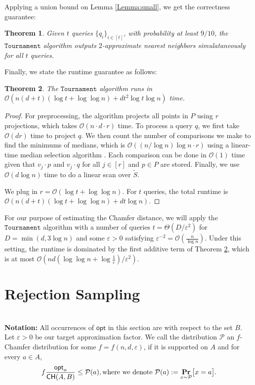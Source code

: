\documentclass[11pt]{article}
\newcommand{\eps}{\varepsilon}
\theoremstyle{plain}
\newtheorem{theorem}{Theorem}[section]
\newcommand{\calP}{\mathcal{P}} \newcommand{\calD}{\mathcal{D}}
\newcommand{\OO}{\mathcal{O}}
\newcommand{\ppr}[2]{\underset{#1}{\text{\bf Pr}} \normalfont\bigl[ #2 \bigr]}
\newcommand{\opt}{\mathsf{opt}}
\newcommand{\Tournament}{\texttt{Tournament}}
\begin{document}
Applying a union bound on Lemma \ref{Lemma:small}, we get the correctness guarantee:

\begin{theorem}
    Given $t$ queries $\{q_i\}_{i \in [t]}$, with probability at least $9/10$, the $\Tournament$ algorithm outputs $2$-approximate nearest neighbors simulataneously for all $t$ queries.
\end{theorem}

Finally, we state the runtime guarantee as follows:

\begin{theorem}\label{Theorem:tournamentTime}
    The $\Tournament$ algorithm runs in $\OO(n (d+ t) (\log t + \log \log n) + dt^2 \log t \log n) $ time.
\end{theorem}


\begin{proof}
    For preprocessing, the algorithm projects all points in $P$ using $r$ projections, which takes $\OO(n \cdot d \cdot r)$ time.
    To process a query $q$, we first take $\OO(dr)$ time to project $q$. We then count the number of comparisons we make to find the minimums of medians, which is $\OO((n/\log n)\log n \cdot r)$ using a linear-time median selection algorithm \cite{BFP73}. Each comparison can be done in $\OO(1)$ time given that $v_j \cdot p$ and $v_j \cdot q$ for all $j \in [r]$ and $p \in P$ are stored. Finally, we use $\OO(d \log n)$ time to do a linear scan over $\tilde{S}$.
    
    We plug in $r = \OO(\log t + \log \log n)$.
    For $t$ queries, the total runtime is $\OO(n (d+ t) (\log t + \log \log n) + dt \log n) $.
\end{proof}

For our purpose of estimating the Chamfer distance, we will apply the $\Tournament$ algorithm with a number of queries $t = \Theta({{D}}/\eps^2)$ for ${{D}} = \min{(d, 3\log n)}$ and some $\eps > 0$ satisfying $\eps^{-2} = \OO(\frac{n}{\log n})$. Under this setting, the runtime is dominated by the first additive term of Theorem \ref{Theorem:tournamentTime}, which is at most $\OO(n d(\log\log n+\log\frac{1}{\eps})/\eps^2)$.





 \section{Rejection Sampling}
\ \\
{\bf Notation:} All occurrences of $\opt$ in this section are with respect to the set $B$. Let $\eps > 0$ be our target approximation factor. We call the distribution $\calP$ an $f$-Chamfer distribution for some $f = f(n, d, \eps)$, if it is supported on $A$ and for every $a \in A$,
\[f\frac{\opt_a}{\mathsf{CH}(A, B)} \leq \calP(a), \text{where we denote } \calP(a) := \ppr{x \sim \calP}{x = a}.\] 
\end{document}
